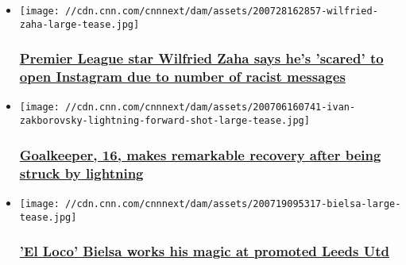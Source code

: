 \begin{itemize}
\item
  \href{/2020/07/29/football/wilfried-zaha-instagram-racist-abuse-premier-league-spt-intl/index.html}{}

  \texttt{[image: //cdn.cnn.com/cnnnext/dam/assets/200728162857-wilfried-zaha-large-tease.jpg]}

  \hypertarget{premier-league-star-wilfried-zaha-says-hes-scared-to-open-instagram-due-to-number-of-racist-messages}{%
  \subsubsection{\texorpdfstring{\href{/2020/07/29/football/wilfried-zaha-instagram-racist-abuse-premier-league-spt-intl/index.html}{Premier
  League star Wilfried Zaha says he's 'scared' to open Instagram due to
  number of racist
  messages}}{Premier League star Wilfried Zaha says he's 'scared' to open Instagram due to number of racist messages}}\label{premier-league-star-wilfried-zaha-says-hes-scared-to-open-instagram-due-to-number-of-racist-messages}}
\item
  \href{/2020/07/22/football/znamya-truda-ivan-zaborovsky-recovery-spt-intl/index.html}{}

  \texttt{[image: //cdn.cnn.com/cnnnext/dam/assets/200706160741-ivan-zakborovsky-lightning-forward-shot-large-tease.jpg]}

  \hypertarget{goalkeeper-16-makes-remarkable-recovery-after-being-struck-by-lightning}{%
  \subsubsection{\texorpdfstring{\href{/2020/07/22/football/znamya-truda-ivan-zaborovsky-recovery-spt-intl/index.html}{Goalkeeper,
  16, makes remarkable recovery after being struck by
  lightning}}{Goalkeeper, 16, makes remarkable recovery after being struck by lightning}}\label{goalkeeper-16-makes-remarkable-recovery-after-being-struck-by-lightning}}
\item
  \href{/2020/07/19/football/leeds-promotion-bielsa-el-loco-spt-intl/index.html}{}

  \texttt{[image: //cdn.cnn.com/cnnnext/dam/assets/200719095317-bielsa-large-tease.jpg]}

  \hypertarget{el-loco-bielsa-works-his-magic-at-promoted-leeds-utd}{%
  \subsubsection{\texorpdfstring{\href{/2020/07/19/football/leeds-promotion-bielsa-el-loco-spt-intl/index.html}{'El
  Loco' Bielsa works his magic at promoted Leeds
  Utd}}{'El Loco' Bielsa works his magic at promoted Leeds Utd}}\label{el-loco-bielsa-works-his-magic-at-promoted-leeds-utd}}
\end{itemize}

